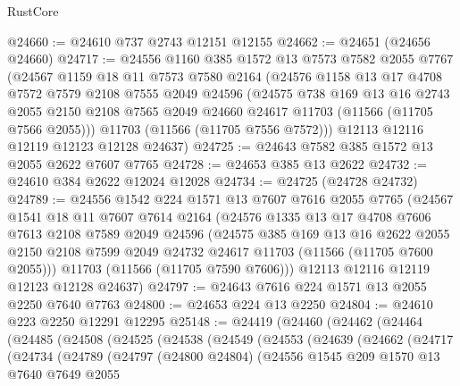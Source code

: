 \begin{lexlean}{RustCore}
\begin{coremodule}
@24660 := @24610 @737 @2743 @12151 @12155
@24662 := @24651 (@24656 @24660)
@24717 := @24556
    @1160
    @385
    @1572
    @13
    @7573
    @7582
    @2055
    @7767
    (@24567
      @1159
      @18
      @11
      @7573
      @7580
      @2164
      (@24576
        @1158
        @13
        @17
        @4708
        @7572
        @7579
        @2108
        @7555
        @2049
        @24596
        (@24575
          @738
          @169
          @13
          @16
          @2743
          @2055
          @2150
          @2108
          @7565
          @2049
          @24660
          @24617
          @11703
          (@11566 (@11705 @7566 @2055)))
        @11703
        (@11566 (@11705 @7556 @7572)))
      @12113
      @12116
      @12119
      @12123
      @12128
      @24637)
@24725 := @24643 @7582 @385 @1572 @13 @2055 @2622 @7607 @7765
@24728 := @24653 @385 @13 @2622
@24732 := @24610 @384 @2622 @12024 @12028
@24734 := @24725 (@24728 @24732)
@24789 := @24556
    @1542
    @224
    @1571
    @13
    @7607
    @7616
    @2055
    @7765
    (@24567
      @1541
      @18
      @11
      @7607
      @7614
      @2164
      (@24576
        @1335
        @13
        @17
        @4708
        @7606
        @7613
        @2108
        @7589
        @2049
        @24596
        (@24575
          @385
          @169
          @13
          @16
          @2622
          @2055
          @2150
          @2108
          @7599
          @2049
          @24732
          @24617
          @11703
          (@11566 (@11705 @7600 @2055)))
        @11703
        (@11566 (@11705 @7590 @7606)))
      @12113
      @12116
      @12119
      @12123
      @12128
      @24637)
@24797 := @24643 @7616 @224 @1571 @13 @2055 @2250 @7640 @7763
@24800 := @24653 @224 @13 @2250
@24804 := @24610 @223 @2250 @12291 @12295
@25148 := @24419
    (@24460
      (@24462
        (@24464
          (@24485
            (@24508
              (@24525
                (@24538
                  (@24549
                    (@24553
                      (@24639
                        (@24662
                          (@24717
                            (@24734
                              (@24789
                                (@24797
                                  (@24800 @24804)
                                  (@24556
                                    @1545
                                    @209
                                    @1570
                                    @13
                                    @7640
                                    @7649
                                    @2055

\end{coremodule}
\end{lexlean}
